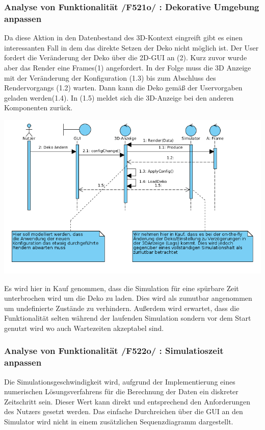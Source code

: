 \subsubsection{Analyse von Funktionalität /F521o/ :  Dekorative Umgebung anpassen}
Da diese Aktion in den Datenbestand des 3D-Kontext eingreift gibt es einen interessanten Fall in dem das direkte Setzen der Deko nicht möglich ist. 
Der User fordert die Veränderung der Deko über die 2D-GUI an (2). Kurz zuvor wurde aber das Render eine Frames(1) angefordert. In der Folge muss die 3D Anzeige mit der Veränderung der Konfiguration (1.3)
bis zum Abschluss des Rendervorgangs (1.2) warten. Dann kann die Deko gemäß der Uservorgaben geladen werden(1.4). In (1.5) meldet sich die 3D-Anzeige bei den anderen Komponenten zurück. 

\includegraphics[width=16cm]{bilder/change_graphic_deko}

Es wird hier in Kauf genommen, dass die Simulation für eine spürbare Zeit unterbrochen wird um die Deko zu laden. Dies wird als zumutbar angenommen um undefinierte Zustände zu verhindern. 
Außerdem wird erwartet, dass die Funktionalität selten während der laufenden Simulation sondern vor dem Start genutzt wird wo auch Wartezeiten akzeptabel sind.

\subsubsection{Analyse von Funktionalität /F522o/ :  Simulatioszeit anpassen}
Die Simulationsgeschwindigkeit wird, aufgrund der Implementierung eines numerischen Lösungsverfahrens für die Berechnung der Daten ein diskreter Zeitschritt sein. Dieser Wert kann direkt und entsprechend
den Anforderungen des Nutzers gesetzt werden. Das einfache Durchreichen über die GUI an den Simulator wird nicht in einem zusätzlichen Sequenzdiagramm dargestellt.
